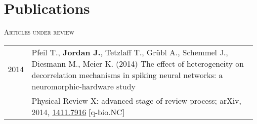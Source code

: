 \documentclass[a4paper,10pt]{article}
\begin{document}
\section{Publications}
\textsc{Articles under review}\\[.5em]
\begin{tabular}{>{\hfill}p{1.6cm} p{}}
  2014 & Pfeil T., \textbf{Jordan J.}, Tetzlaff T., Gr\"ubl A., Schemmel J., Diesmann M., Meier K. (2014) The effect of heterogeneity on decorrelation mechanisms in spiking neural networks: a neuromorphic-hardware study \\
  & \footnotesize Physical Review X: advanced stage of review process; arXiv, 2014, \href{http://arxiv.org/abs/1411.7916}{1411.7916} [q-bio.NC]
\end{tabular} \\[1em]

\newpage
\end{document}
